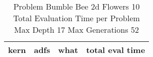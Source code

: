 \begin{table}[H]
\caption{Problem  Bumble Bee 2d  Flowers 10\\Total Evaluation Time per Problem \\ Max Depth 17 Max Generations 52\\}
\begin{center}
\scalebox{1.0} %
{
\begin{tabular}{lllr}
\hline
kern & adfs & what & total eval time \\
\hline


\end{tabular}
}
\end{center}
\end{table}

